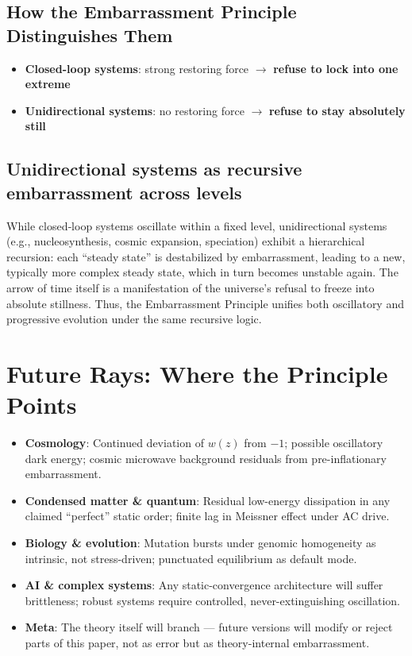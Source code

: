 \documentclass[10pt,a4paper]{article}
\begin{document}
\subsection{How the Embarrassment Principle Distinguishes Them}
\begin{itemize}[noitemsep]
\item \textbf{Closed-loop systems}: strong restoring force $\to$ \textbf{refuse to lock into one extreme}
\item \textbf{Unidirectional systems}: no restoring force $\to$ \textbf{refuse to stay absolutely still}
\end{itemize}

\subsection{Unidirectional systems as recursive embarrassment across levels}
While closed‑loop systems oscillate within a fixed level, unidirectional systems (e.g., nucleosynthesis, cosmic expansion, speciation) exhibit a hierarchical recursion: each “steady state” is destabilized by embarrassment, leading to a new, typically more complex steady state, which in turn becomes unstable again. The arrow of time itself is a manifestation of the universe’s refusal to freeze into absolute stillness. Thus, the Embarrassment Principle unifies both oscillatory and progressive evolution under the same recursive logic.

\section*{Future Rays: Where the Principle Points}
\begin{itemize}
\item \textbf{Cosmology}: Continued deviation of $w(z)$ from $-1$; possible oscillatory dark energy; cosmic microwave background residuals from pre-inflationary embarrassment.
\item \textbf{Condensed matter \& quantum}: Residual low-energy dissipation in any claimed “perfect” static order; finite lag in Meissner effect under AC drive.
\item \textbf{Biology \& evolution}: Mutation bursts under genomic homogeneity as intrinsic, not stress-driven; punctuated equilibrium as default mode.
\item \textbf{AI \& complex systems}: Any static-convergence architecture will suffer brittleness; robust systems require controlled, never-extinguishing oscillation.
\item \textbf{Meta}: The theory itself will branch — future versions will modify or reject parts of this paper, not as error but as theory-internal embarrassment.
\end{itemize}
\end{document}
